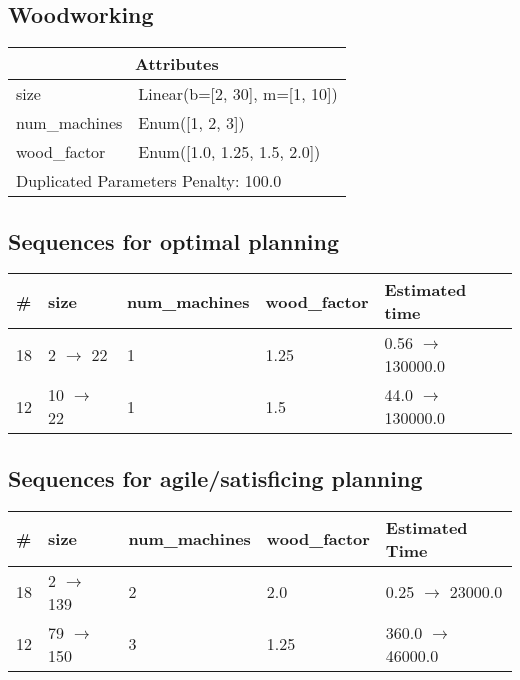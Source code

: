 \documentclass{article}
\begin{document}
                            \newpage \subsection{Woodworking}
                    \begin{center}
                    \begin{tabular}{@{}p{}p{}@{}}
                    \multicolumn{2}{c}{\bf \large Attributes}\\\midrule
                    size & Linear(b=[2, 30], m=[1, 10])\\
num\_machines & Enum([1, 2, 3])\\
wood\_factor & Enum([1.0, 1.25, 1.5, 2.0]) \\\midrule
                    \multicolumn{2}{l}{Duplicated Parameters Penalty: 100.0}
                    \end{tabular}
                    \end{center}
                
                            \subsection*{Sequences for optimal planning}

                            \begin{center}
                            \begin{tabular}{@{}l|l|l|l|l@{}}
                            \# & size & num\_machines & wood\_factor & Estimated time\\\midrule
                            18&2 $\rightarrow$ 22&1&1.25&0.56 $\rightarrow$ 130000.0\\
12&10 $\rightarrow$ 22&1&1.5&44.0 $\rightarrow$ 130000.0
                            \end{tabular}
                            \end{center}
                    
                         \subsection*{Sequences for agile/satisficing planning}

                        \begin{center}
                        \begin{tabular}{@{}l|l|l|l|l@{}}
                        \# & size & num\_machines & wood\_factor & Estimated Time\\\midrule
                        18&2 $\rightarrow$ 139&2&2.0&0.25 $\rightarrow$ 23000.0\\
12&79 $\rightarrow$ 150&3&1.25&360.0 $\rightarrow$ 46000.0
                        \end{tabular}
                        \end{center}
                    
\end{document}
